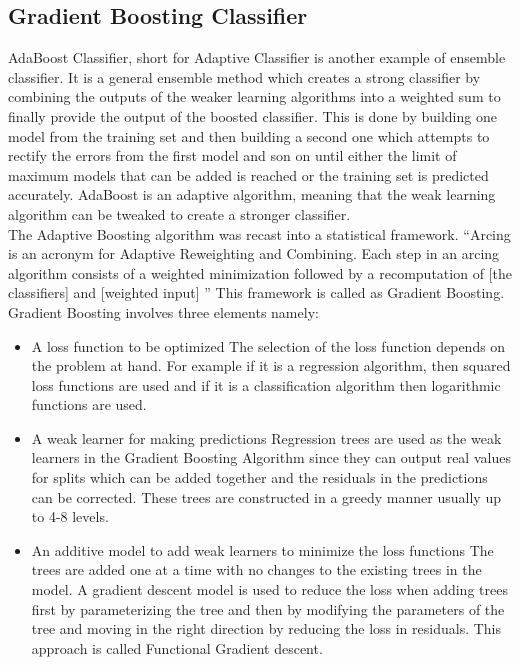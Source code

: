\subsection{Gradient Boosting Classifier}
AdaBoost Classifier, short for Adaptive Classifier is another example of ensemble classifier. 
It is a general ensemble method which creates a strong classifier by combining the outputs of the weaker learning algorithms into a weighted sum to finally provide the output of the boosted classifier. This is done by building one model from the training set and then building a second one which attempts to rectify the errors from the first model and son on until either the limit of maximum models that can be added is reached or the training set is predicted accurately. AdaBoost is an adaptive algorithm, meaning that the weak learning algorithm can be tweaked to create a stronger classifier. \\
The Adaptive Boosting algorithm was recast into a statistical framework. ``Arcing is an acronym for Adaptive Reweighting and Combining. Each step in an arcing algorithm consists of a weighted minimization followed by a recomputation of [the classifiers] and [weighted input] \cite{link15}''
This framework is called as Gradient Boosting. \\
Gradient Boosting involves three elements namely:
\begin{itemize}
 \item{A loss function to be optimized}
 The selection of the loss function depends on the problem at hand. For example if it is a regression algorithm, then squared loss functions are used and if it is a classification algorithm then logarithmic functions are used.
 \item{A weak learner for making predictions}
 Regression trees are used as the weak learners in the Gradient Boosting Algorithm since they can output real values for splits which can be added together and the residuals in the predictions can be corrected. These trees are constructed in a greedy manner usually up to 4-8 levels.
 \item{An additive model to add weak learners to minimize the loss functions}
 The trees are added one at a time with no changes to the existing trees in the model. A gradient descent model is used to reduce the loss when adding trees first by parameterizing the tree and then by modifying the parameters of the tree and moving in the right direction by reducing the loss in residuals. This approach is called Functional Gradient descent.
\end{itemize}

